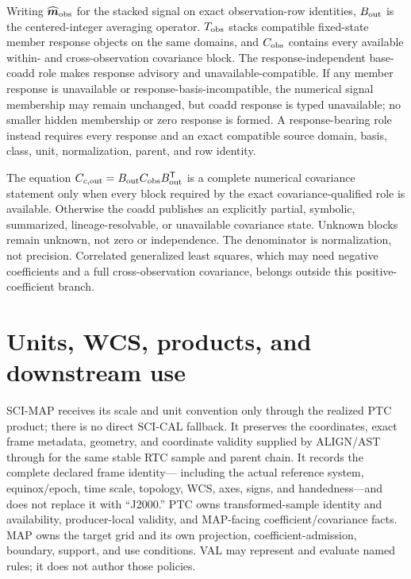 \documentclass[10pt]{article}
\begin{document}
Writing \(\widehat{\boldsymbol m}_{\rm obs}\) for the stacked signal on exact
observation-row identities, \(B_{\rm out}\) is the centered-integer averaging
operator. \(T_{\rm obs}\) stacks compatible fixed-state member response objects on the
same domains, and \(C_{\rm obs}\) contains every available within- and
cross-observation covariance block. The response-independent base-coadd role
makes response advisory and unavailable-compatible. If any member response is
unavailable or response-basis-incompatible, the numerical signal membership
may remain unchanged, but coadd response is typed unavailable; no smaller
hidden membership or zero response is formed. A response-bearing role instead
requires every response and an exact compatible source domain, basis, class,
unit, normalization, parent, and row identity.

The equation \(C_{c,{\rm out}}=B_{\rm out}C_{\rm obs}B_{\rm out}^{\mathsf T}\)
is a complete numerical covariance statement only when every block required
by the exact covariance-qualified role is available. Otherwise the coadd
publishes an explicitly partial, symbolic, summarized, lineage-resolvable, or
unavailable covariance state. Unknown blocks remain unknown, not zero or
independence. The denominator is normalization,
not precision. Correlated generalized least squares, which may
need negative coefficients and a full cross-observation covariance, belongs
outside this positive-coefficient branch.

\clearpage
\section{Units, WCS, products, and downstream use}\label{sec:products}
SCI-MAP receives its scale and unit convention only through the realized PTC
product; there is no direct SCI-CAL fallback. It preserves the coordinates,
exact frame metadata, geometry, and coordinate validity supplied by ALIGN/AST
through \SCIMapASTRTCGridProfile{} for the same stable RTC
sample and parent chain. It records the complete declared frame identity---
including the actual reference system, equinox/epoch, time scale, topology,
WCS, axes, signs, and handedness---and does not replace it with ``J2000.'' PTC
owns transformed-sample identity and availability, producer-local validity,
and MAP-facing coefficient/covariance facts. MAP owns the target grid and its
own projection, coefficient-admission, boundary, support, and use conditions.
VAL may represent and evaluate named rules; it does not author those policies.
\end{document}

